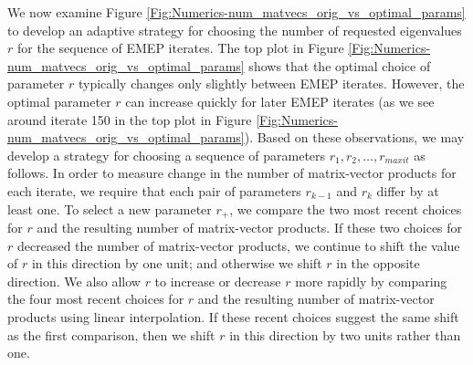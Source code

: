 We now examine Figure \ref{Fig:Numerics-num_matvecs_orig_vs_optimal_params} to develop an adaptive strategy for choosing the number of requested eigenvalues $r$ for the sequence of EMEP iterates.
The top plot in Figure \ref{Fig:Numerics-num_matvecs_orig_vs_optimal_params} shows that the optimal choice of parameter $r$ typically changes only slightly between EMEP iterates.
However, the optimal parameter $r$ can increase quickly for later EMEP iterates (as we see around iterate 150 in the top plot in Figure \ref{Fig:Numerics-num_matvecs_orig_vs_optimal_params}).
Based on these observations, we may develop a strategy for choosing a sequence of parameters $r_1, r_2, \ldots, r_{maxit}$ as follows.
In order to measure change in the number of matrix-vector products for each iterate, we require that each pair of parameters $r_{k-1}$ and $r_k$ differ by at least one.
To select a new parameter $r_+$, we compare the two most recent choices for $r$ and the resulting number of matrix-vector products.
If these two choices for $r$ decreased the number of matrix-vector products, we continue to shift the value of $r$ in this direction by one unit; and otherwise we shift $r$ in the opposite direction.
We also allow $r$ to increase or decrease $r$ more rapidly by comparing the four most recent choices for $r$ and the resulting number of matrix-vector products using linear interpolation.
If these recent choices suggest the same shift as the first comparison, then we shift $r$ in this direction by two units rather than one.



